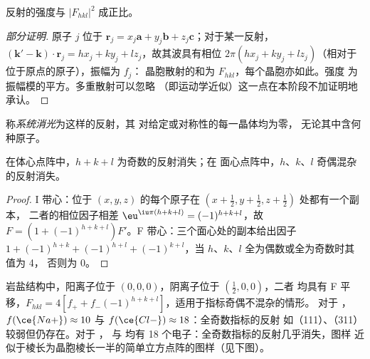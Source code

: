 \begin{proposition}[强度]\label{prop:b3:x-ray-diffraction:intensity}
反射的强度与 $|F_{hkl}|^2$ 成正比。
\end{proposition}

\begin{proof}[部分证明]
原子 $j$ 位于 $\mathbf r_j = x_j\mathbf a + y_j\mathbf b + z_j\mathbf c$；对于某一反射，
$(\mathbf k' - \mathbf k)\cdot\mathbf r_j = hx_j + ky_j + lz_j$，故其波具有相位
$2\pi(hx_j + ky_j + lz_j)$（相对于位于原点的原子），振幅为 $f_j$：
晶胞散射的和为 $F_{hkl}$，每个晶胞亦如此。强度
为振幅模的平方。多重散射可以忽略
（即运动学近似）这一点在本阶段不加证明地承认。
\end{proof}

\begin{definition}[系统消光]\label{def:b3:x-ray-diffraction:absence}
称\emph{系统消光}为这样的反射，其
对给定或对称性的每一晶体均为零，
无论其中含何种原子。
\end{definition}

\begin{proposition}[带心点阵的消光]\label{prop:b3:x-ray-diffraction:absences}
在体心点阵中，$h + k + l$ 为奇数的反射消失；在
面心点阵中，$h$、$k$、$l$ 奇偶混杂的反射消失。
\end{proposition}

\begin{proof}
I 带心：位于 $(x,y,z)$ 的每个原子在 $(x + \frac12, y + \frac12, z + \frac12)$ 处都有一个副本，
二者的相位因子相差 $\eu^{\iu\pi(h+k+l)} = (-1)^{h+k+l}$，故 $F = (1 +
(-1)^{h+k+l})F'$。F 带心：三个面心处的副本给出因子 $1 +
(-1)^{h+k} + (-1)^{h+l} + (-1)^{k+l}$，当 $h$、$k$、$l$ 全为偶数或全为奇数时其值为 4，
否则为 0。
\end{proof}

\begin{example}[岩盐与钾石盐]\label{ex:b3:x-ray-diffraction:nacl-kcl}
岩盐结构中，阳离子位于 $(0,0,0)$，阴离子位于 $(\frac12,0,0)$，二者
均具有 F 平移，$F_{hkl} = 4[f_+ + f_-(-1)^{h+k+l}]$，适用于指标奇偶不混杂的情形。
对于 ，$f(\ce{Na+}) \approx 10$ 与 $f(\ce{Cl-}) \approx 18$：全奇数指标的反射
如（111）、（311）较弱但仍存在。对于 ， 与  均有 18
个电子：全奇数指标的反射几乎消失，图样
近似于棱长为晶胞棱长一半的简单立方点阵的图样（见下图）。
\end{example}

